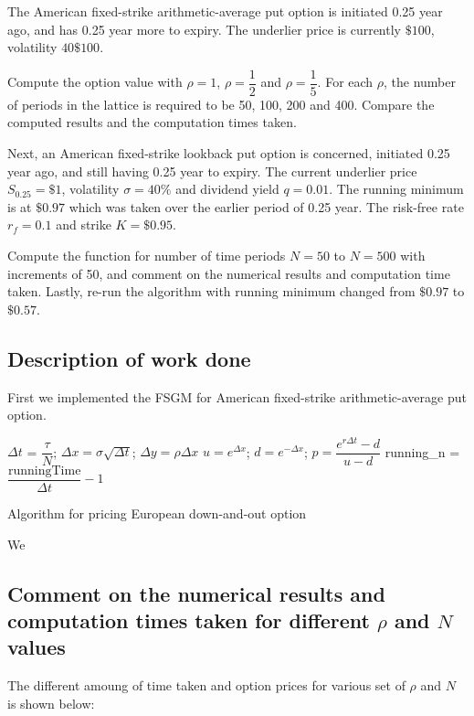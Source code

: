 The American fixed-strike arithmetic-average put option is initiated 0.25 year ago, and has 0.25 year more to expiry. The underlier price is currently $\$100$, volatility $40%
\$100$.

Compute the option value with $\rho=1$, $\rho=\dfrac{1}{2}$ and $\rho = \dfrac{1}{5}$. For each $\rho$, the number of periods in the lattice is required to be 50, 100, 200 and 400. Compare the computed results and the computation times taken.

Next, an American fixed-strike lookback put option is concerned, initiated 0.25 year ago, and still having 0.25 year to expiry. The current underlier price $S_{0.25}=\$1$, volatility $\sigma=40\%$ and dividend yield $q = 0.01$. The running minimum is at $\$0.97$ which was taken over the earlier period of 0.25 year. The risk-free rate $r_f=0.1$ and strike $K=\$0.95$.

Compute the function for number of time periods $N = 50$ to $N = 500$ with increments of 50, and comment on the numerical results and computation time taken. Lastly, re-run the algorithm with running minimum changed from $\$0.97$ to $\$0.57$.

\subsection{Description of work done}
First we implemented the FSGM for American fixed-strike arithmetic-average put option.

\begin{algorithm}[H]
	$\Delta t$ = $\dfrac{\tau}{N}$;
	$\Delta x = \sigma \sqrt{\Delta t}$;
	$\Delta y = \rho \Delta x$\;
	$u = e^{\Delta x}$;
	$d = e^{-\Delta x}$;
	$p = \dfrac{e^{r \Delta t} - d}{u - d}$\;
	running_n = $\dfrac{\text{runningTime}}{\Delta t} - 1$\;
	
\caption{Algorithm for pricing European down-and-out option}
\end{algorithm}

We

\subsection{Comment on the numerical results and computation times taken for different $\rho$ and $N$ values}
The different amoung of time taken and option prices for various set of $\rho$ and $N$ is shown below:



